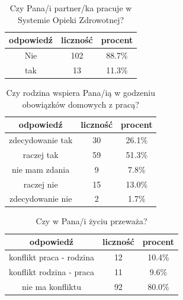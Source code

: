 \documentclass[a4paper,12pt,twoside,openany]{report}
\begin{document}
\begin{table}[h]
\caption{Czy Pana/i partner/ka pracuje w Systemie Opieki Zdrowotnej?}
\centering
\begin{tabular}{ | c | c | c |}
\hline
odpowiedź & liczność & procent\\
\hline
Nie  &  102  & 88.7\% \\
\hline
tak  &  13  & 11.3\% \\
\hline
\end{tabular}
\label{tab:Q25}
\end{table}



\begin{table}[h]
\caption{Czy rodzina wspiera Pana/ią w godzeniu obowiązków domowych z pracą?}
\centering
\begin{tabular}{ | c | c | c |}
\hline
odpowiedź & liczność & procent\\
\hline
zdecydowanie tak  &  30  & 26.1\% \\
\hline
raczej tak  &  59  & 51.3\% \\
\hline
nie mam zdania  &  9  & 7.8\% \\
\hline
raczej nie  &  15  & 13.0\% \\
\hline
zdecydowanie nie  &  2  & 1.7\% \\
\hline
\end{tabular}
\label{tab:Q26}
\end{table}



\begin{table}[h]
\caption{Czy w Pana/i życiu przeważa?}
\centering
\begin{tabular}{ | c | c | c |}
\hline
odpowiedź & liczność & procent\\
\hline
konflikt praca - rodzina  &  12  & 10.4\% \\
\hline
konflikt rodzina - praca  &  11  & 9.6\% \\
\hline
nie ma konfliktu  &  92  & 80.0\% \\
\hline
\end{tabular}
\label{tab:Q27}
\end{table}
\end{document}

